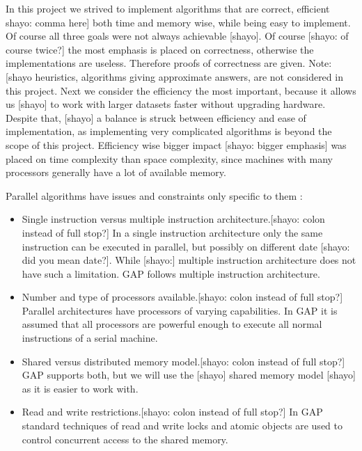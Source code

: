 \documentclass{report}
\theoremstyle{plain}
\theoremstyle{definition}
\theoremstyle{remark}
\numberwithin{definition}{chapter}
\numberwithin{example}{chapter}
\numberwithin{figure}{chapter}
\begin{document}
{{In this project we strived to implement algorithms that are correct, efficient {shayo: comma here] both time and memory wise, while being easy to implement. Of course all three goals were not always achievable [shayo]. Of course [shayo: of course twice?] the most emphasis is placed on correctness, otherwise the implementations are useless. Therefore proofs of correctness are given. Note:[shayo} heuristics, algorithms giving approximate answers, are not considered in this project. Next we consider the efficiency the most important, because it allows us [shayo] to work with larger datasets faster without upgrading hardware. Despite that, [shayo] a balance is struck between efficiency and ease of implementation, as implementing very complicated algorithms is beyond the scope of this project. Efficiency wise bigger impact [shayo: bigger emphasis] was placed on time complexity than space complexity, since machines with many processors generally have a lot of available memory.

Parallel algorithms have issues and constraints only specific to them \cite{berman1996fundamentals}:

\begin{itemize}
  \item Single instruction versus multiple instruction architecture.[shayo: colon instead of full stop?] In a single instruction architecture only the same instruction can be executed in parallel, but possibly on different date [shayo: did you mean date?]. While [shayo:] multiple instruction architecture does not have such a limitation. GAP follows multiple instruction architecture.
  \item Number and type of processors available.[shayo: colon instead of full stop?] Parallel architectures have processors of varying capabilities. In GAP it is assumed that all processors are powerful enough to execute all normal instructions of a serial machine.
  \item Shared versus distributed memory model.[shayo: colon instead of full stop?] GAP supports both, but we will use the [shayo] shared memory model [shayo] as it is easier to work with.
  \item Read and write restrictions.[shayo: colon instead of full stop?] In GAP standard techniques of read and write locks and atomic objects are used to control concurrent access to the shared memory.
\end{itemize}

}}
\end{document}
